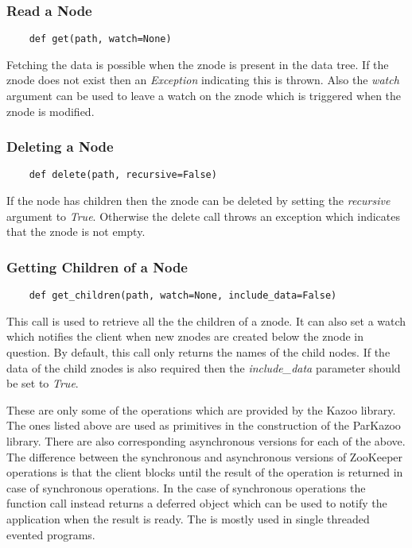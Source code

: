   \subsubsection{Read a Node}
  \begin{lstlisting}
    def get(path, watch=None)
  \end{lstlisting}
  Fetching the data is possible when the znode is present in the data tree. If the znode does not exist then an \textit{Exception} indicating this is thrown. Also the \textit{watch} argument can be used to leave a watch on the znode which is triggered when the znode is modified.
  
  \subsubsection{Deleting a Node}
  \begin{lstlisting}
    def delete(path, recursive=False)
  \end{lstlisting}
  If the node has children then the znode can be deleted by setting the \textit{recursive} argument to \textit{True}. Otherwise the delete call throws an exception which indicates that the znode is not empty.
  
  \subsubsection{Getting Children of a Node}
  \begin{lstlisting}
    def get_children(path, watch=None, include_data=False)
  \end{lstlisting}
  This call is used to retrieve all the the children of a znode. It can also set a watch which notifies the client when new znodes are created below the znode in question. By default, this call only returns the names of the child nodes. If the data of the child znodes is also required then the \textit{include\_data} parameter should be set to \textit{True}.
  
  These are only some of the operations which are provided by the Kazoo library. The ones listed above are used as primitives in the construction of the ParKazoo library. There are also corresponding asynchronous versions for each of the above. The difference between the synchronous and asynchronous versions of ZooKeeper operations is that the client blocks until the result of the operation is returned in case of synchronous operations. In the case of synchronous operations the function call instead returns a deferred object which can be used to notify the application when the result is ready. The is mostly used in single threaded evented programs.
  
